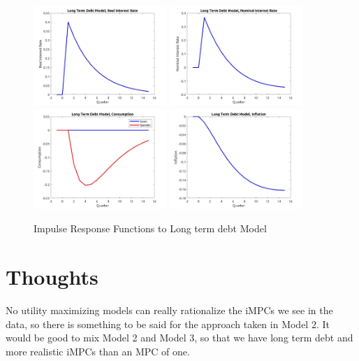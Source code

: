 \documentclass[AER]{AEA}
\begin{document}
 
\begin{figure}
	\includegraphics[width=0.45\textwidth]{../Code/Dynare/Figures/RealRateLT_debt.jpg}
	\includegraphics[width=0.45\textwidth]{../Code/Dynare/Figures/NominalRateLT_debt.jpg}
	\includegraphics[width=0.45\textwidth]{../Code/Dynare/Figures/ConsumptionLT_debt.jpg}
	\includegraphics[width=0.45\textwidth]{../Code/Dynare/Figures/InflationLT_debt.jpg}
	\caption{Impulse Response Functions to Long term debt Model}
	\label{fig:IRFLT}
\end{figure}

\section{Thoughts}
No utility maximizing models can really rationalize the iMPCs we see in the data, so there is something to be said for the approach taken in Model 2. It would be good to mix Model 2 and Model 3, so that we have long term debt and more realistic iMPCs than an MPC of one.
\end{document}
